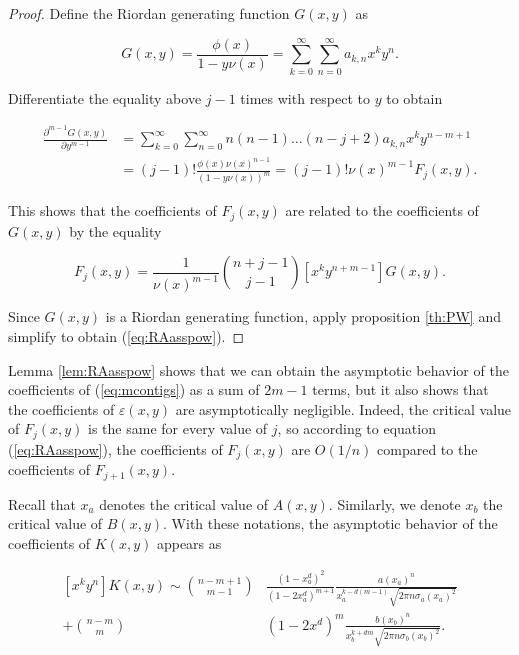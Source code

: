 \documentclass{article}
\begin{document}
\begin{proof}
Define the Riordan generating function $G(x,y)$ as

\begin{equation*}
G(x,y) = \frac{\phi(x)}{1-y\nu(x)} =
\sum_{k=0}^\infty\sum_{n=0}^\infty a_{k,n} x^ky^n.
\end{equation*}

Differentiate the equality above $j-1$ times with respect to $y$ to
obtain

\begin{equation*}
\begin{split}
\frac{\partial^{m-1} G(x,y)}{\partial y^{m-1}} &=
\sum_{k=0}^\infty\sum_{n=0}^\infty n(n-1)\ldots(n-j+2)
a_{k,n} x^ky^{n-m+1} \\
&= (j-1)!\frac{\phi(x)\nu(x)^{n-1}}{(1-y\nu(x))^m}
= (j-1)!\nu(x)^{m-1}F_j(x,y).
\end{split}
\end{equation*}

This shows that the coefficients of $F_j(x,y)$ are related to the
coefficients of $G(x,y)$ by the equality

\begin{equation*}
[x^ky^n]F_j(x,y) = \frac{1}{\nu(x)^{m-1}} {n+j-1 \choose j-1}
  [x^ky^{n+m-1}]G(x,y).
\end{equation*}

Since $G(x,y)$ is a Riordan generating function, apply proposition
\ref{th:PW} and simplify to obtain (\ref{eq:RAasspow}).
\end{proof}

Lemma \ref{lem:RAasspow} shows that we can obtain the asymptotic behavior
of the coefficients of (\ref{eq:mcontigs}) as a sum of $2m-1$ terms, but
it also shows that the coefficients of $\varepsilon(x,y)$ are
asymptotically negligible. Indeed, the critical value of $F_j(x,y)$
is the same for every value of $j$, so according to equation
(\ref{eq:RAasspow}), the coefficients of $F_j(x,y)$ are
$O(1/n)$ compared to the coefficients of $F_{j+1}(x,y)$.

Recall that $x_a$ denotes the critical value of $A(x,y)$. Similarly, we
denote $x_b$ the critical value of $B(x,y)$. With these notations, the
asymptotic behavior of the coefficients of $K(x,y)$ appears as

\begin{equation}
\label{eq:nasty}
\begin{split}
[x^ky^n]K(x,y) \sim {n-m+1 \choose m-1 }
    &\frac{(1-x_a^d)^2}{(1-2x_a^d)^{m+1}}
    \frac{a(x_a)^n} {x_a^{k-d(m-1)}\sqrt{2\pi n \sigma_a(x_a)^2}} \\
 + {n-m \choose m} &(1-2x^d)^m
    \frac{b(x_b)^n} {x_b^{k+dm}\sqrt{2\pi n \sigma_b(x_b)^2}}.
\end{split}
\end{equation}
\end{document}
